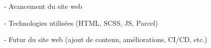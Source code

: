 
- Avancement du site web

- Technologies utilisées (HTML, SCSS, JS, Parcel)

- Futur du site web (ajout de contenu, améliorations, CI/CD, etc.)  
